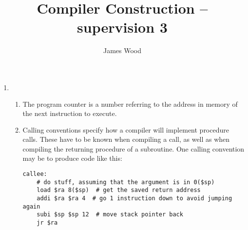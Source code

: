 \documentclass{article}
\begin{document}
\title{Compiler Construction -- supervision 3}
\author{James Wood}
\maketitle

\begin{enumerate}
  \item
    \begin{enumerate}
      \item The program counter is a number referring to the address in memory of the next instruction to execute.
      \item Calling conventions specify how a compiler will implement procedure calls. These have to be known when compiling a call, as well as when compiling the returning procedure of a subroutine. One calling convention may be to produce code like this:
        \begin{lstlisting}[language={[x86masm]Assembler},showstringspaces=false]
callee:
    # do stuff, assuming that the argument is in 0($sp)
    load $ra 8($sp)  # get the saved return address
    addi $ra $ra 4  # go 1 instruction down to avoid jumping again
    subi $sp $sp 12  # move stack pointer back
    jr $ra


\end{lstlisting}
\end{enumerate}
\end{enumerate}
\end{document}
